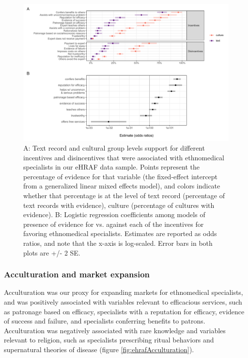 \documentclass[
  11pt,
]{article}
\begin{document}
\begin{landscape}

\begin{figure}[p]

{\centering \includegraphics{magic-healers-article2_files/figure-latex/ehrafincentivesPlot-1} 

}

\caption{A: Text record and cultural group levels support for different incentives and disincentives that were associated with ethnomedical specialists in our eHRAF data sample. Points represent the percentage of evidence for that variable (the fixed-effect intercept from a generalized linear mixed effects model), and colors indicate whether that percentage is at the level of text record (percentage of text records with evidence), culture (percentage of cultures with evidence). B: Logistic regression coefficients among models of presence of evidence for vs. against each of the incentives for favoring ethnomedical specialists. Estimates are reported as odds ratios, and note that the x-axis is log-scaled. Error bars in both plots are +/- 2 SE.}\label{fig:ehrafincentivesPlot}
\end{figure}

\end{landscape}

\hypertarget{acculturation-and-market-expansion}{%
\subsubsection{Acculturation and market expansion}\label{acculturation-and-market-expansion}}

Acculturation was our proxy for expanding markets for ethnomedical specialists, and was positively associated with variables relevant to efficacious services, such as patronage based on efficacy, specialists with a reputation for efficacy, evidence of success and failure, and specialists conferring benefits to patrons. Acculturation was negatively associated with rare knowledge and variables relevant to religion, such as specialists prescribing ritual behaviors and supernatural theories of disease (figure \ref{fig:ehrafAcculturation}).
\end{document}
